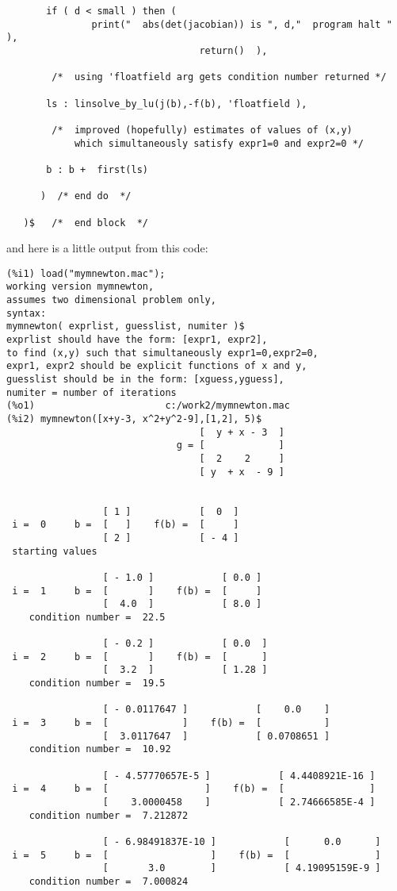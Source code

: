 \documentclass[12pt]{article}
\begin{document}
\begin{verbatim}
       if ( d < small ) then (     
               print("  abs(det(jacobian)) is ", d,"  program halt " ),
                                  return()  ),  
      
        /*  using 'floatfield arg gets condition number returned */
     
       ls : linsolve_by_lu(j(b),-f(b), 'floatfield ),
      
        /*  improved (hopefully) estimates of values of (x,y)
            which simultaneously satisfy expr1=0 and expr2=0 */
            
       b : b +  first(ls) 
                                                         
      )  /* end do  */
      
   )$   /*  end block  */
\end{verbatim}
\normalsize
\newpage
and here is a little output from this code:
\small
\begin{verbatim}
(%i1) load("mymnewton.mac");
working version mymnewton,
assumes two dimensional problem only,
syntax: 
mymnewton( exprlist, guesslist, numiter )$
exprlist should have the form: [expr1, expr2],
to find (x,y) such that simultaneously expr1=0,expr2=0,
expr1, expr2 should be explicit functions of x and y,
guesslist should be in the form: [xguess,yguess],
numiter = number of iterations 
(%o1)                       c:/work2/mymnewton.mac
(%i2) mymnewton([x+y-3, x^2+y^2-9],[1,2], 5)$
                                  [  y + x - 3  ]
                              g = [             ]
                                  [  2    2     ]
                                  [ y  + x  - 9 ]

   
                 [ 1 ]            [  0  ]
 i =  0     b =  [   ]    f(b) =  [     ] 
                 [ 2 ]            [ - 4 ]
 starting values  
   
                 [ - 1.0 ]            [ 0.0 ]
 i =  1     b =  [       ]    f(b) =  [     ] 
                 [  4.0  ]            [ 8.0 ]
    condition number =  22.5 
   
                 [ - 0.2 ]            [ 0.0  ]
 i =  2     b =  [       ]    f(b) =  [      ] 
                 [  3.2  ]            [ 1.28 ]
    condition number =  19.5 
   
                 [ - 0.0117647 ]            [    0.0    ]
 i =  3     b =  [             ]    f(b) =  [           ] 
                 [  3.0117647  ]            [ 0.0708651 ]
    condition number =  10.92 
   
                 [ - 4.57770657E-5 ]            [ 4.4408921E-16 ]
 i =  4     b =  [                 ]    f(b) =  [               ] 
                 [    3.0000458    ]            [ 2.74666585E-4 ]
    condition number =  7.212872 
   
                 [ - 6.98491837E-10 ]            [      0.0      ]
 i =  5     b =  [                  ]    f(b) =  [               ] 
                 [       3.0        ]            [ 4.19095159E-9 ]
    condition number =  7.000824 
\end{verbatim}
\end{document}
